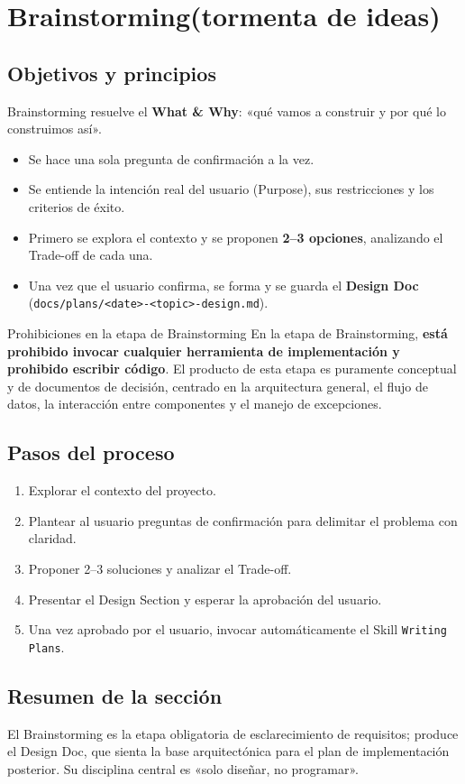 \section{Brainstorming(tormenta de ideas)}

\subsection{Objetivos y principios}

Brainstorming resuelve el \textbf{What \& Why}: «qué vamos a construir y por qué lo construimos así».

\begin{itemize}
    \item Se hace una sola pregunta de confirmación a la vez.
    \item Se entiende la intención real del usuario (Purpose), sus restricciones y los criterios de éxito.
    \item Primero se explora el contexto y se proponen \textbf{2--3 opciones}, analizando el Trade-off de cada una.
    \item Una vez que el usuario confirma, se forma y se guarda el \textbf{Design Doc} (\texttt{docs/plans/<date>-<topic>-design.md}).
\end{itemize}

\begin{warningbox}{Prohibiciones en la etapa de Brainstorming}
En la etapa de Brainstorming, \textbf{está prohibido invocar cualquier herramienta de implementación y prohibido escribir código}. El producto de esta etapa es puramente conceptual y de documentos de decisión, centrado en la arquitectura general, el flujo de datos, la interacción entre componentes y el manejo de excepciones.
\end{warningbox}

\subsection{Pasos del proceso}

\begin{enumerate}
    \item Explorar el contexto del proyecto.
    \item Plantear al usuario preguntas de confirmación para delimitar el problema con claridad.
    \item Proponer 2--3 soluciones y analizar el Trade-off.
    \item Presentar el Design Section y esperar la aprobación del usuario.
    \item Una vez aprobado por el usuario, invocar automáticamente el Skill \texttt{Writing Plans}.
\end{enumerate}

\subsection{Resumen de la sección}

El Brainstorming es la etapa obligatoria de esclarecimiento de requisitos; produce el Design Doc, que sienta la base arquitectónica para el plan de implementación posterior. Su disciplina central es «solo diseñar, no programar».


